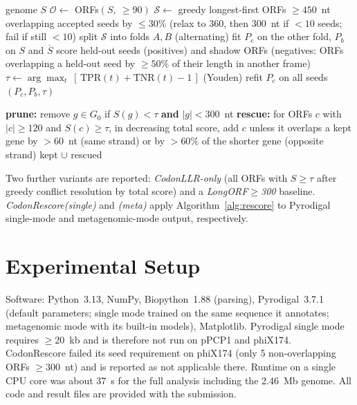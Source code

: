 \begin{algorithm}[t]
\caption{CodonRescore training (annotation-free)}\label{alg:train}
\begin{algorithmic}[1]
\Require genome $S$
\State $\mathcal{O}\gets$ ORFs$(S,\ \ge 90)$
\State $\mathcal{S}\gets$ greedy longest-first ORFs $\ge 450$~nt overlapping accepted seeds by $\le 30\%$ (relax to 360, then 300~nt if $<10$ seeds; fail if still $<10$)
\State split $\mathcal{S}$ into folds $A,B$ (alternating)
  \State fit $P_c$ on the other fold, $P_b$ on $S$ and $\overline{S}$
  \State score held-out seeds (positives) and shadow ORFs (negatives: ORFs overlapping a held-out seed by $\ge 50\%$ of their length in another frame)
\EndFor
\State $\tau\gets\arg\max_t\ [\,\mathrm{TPR}(t)+\mathrm{TNR}(t)-1\,]$ (Youden)
\State refit $P_c$ on all seeds \Return $(P_c,P_b,\tau)$
\end{algorithmic}
\end{algorithm}

\begin{algorithm}[t]
\caption{CodonRescore re-scoring of a gene set $G_0$}\label{alg:rescore}
\begin{algorithmic}[1]
\State \textbf{prune:} remove $g\in G_0$ if $S(g)<\tau$ \textbf{and} $|g|<300$~nt
\State \textbf{rescue:} for ORFs $c$ with $|c|\ge120$ and $S(c)\ge\tau$, in decreasing total score, add $c$ unless it overlaps a kept gene by $>60$~nt (same strand) or by $>60\%$ of the shorter gene (opposite strand)
\State \Return kept $\cup$ rescued
\end{algorithmic}
\end{algorithm}

Two further variants are reported: \emph{CodonLLR-only} (all ORFs with $S\ge\tau$ after greedy conflict resolution by total score) and a \emph{LongORF$\ge$300} baseline. \emph{CodonRescore(single)} and \emph{(meta)} apply Algorithm~\ref{alg:rescore} to Pyrodigal single-mode and metagenomic-mode output, respectively.

\section{Experimental Setup}
Software: Python~3.13, NumPy, Biopython~1.88 (parsing), Pyrodigal~3.7.1 (default parameters; single mode trained on the same sequence it annotates; metagenomic mode with its built-in models), Matplotlib. Pyrodigal single mode requires $\geq$20~kb and is therefore not run on pPCP1 and phiX174. CodonRescore failed its seed requirement on phiX174 (only 5 non-overlapping ORFs $\geq$300~nt) and is reported as not applicable there. Runtime on a single CPU core was about 37~s for the full analysis including the 2.46~Mb genome. All code and result files are provided with the submission.

